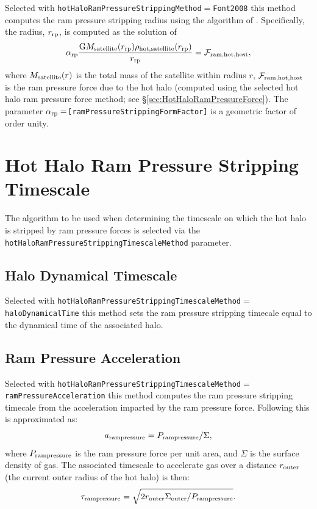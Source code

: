 Selected with {\tt hotHaloRamPressureStrippingMethod}$=${\tt Font2008} this method computes the ram pressure stripping radius using the algorithm of \cite{font_colours_2008}. Specifically, the radius, $r_{\rm rp}$, is computed as the solution of
\begin{equation}
\alpha_{\rm rp} {{\rm G} M_{\rm satellite}(r_{\rm rp}) \rho_{\rm hot, satellite}(r_{\rm rp}) \over r_{\rm rp} } = \mathcal{F}_{\rm ram, hot, host},
\end{equation}
where $M_{\rm satellite}(r)$ is the total mass of the satellite within radius $r$, $\mathcal{F}_{\rm ram, hot, host}$ is the ram pressure force due to the hot halo (computed using the selected hot halo ram pressure force method; see \S\ref{sec:HotHaloRamPressureForce}). The parameter $\alpha_{\rm rp}=${\tt [ramPressureStrippingFormFactor]} is a geometric factor of order unity.


\section{Hot Halo Ram Pressure Stripping Timescale}

The algorithm to be used when determining the timescale on which the hot halo is stripped by ram pressure forces is selected via the {\tt hotHaloRamPressureStrippingTimescaleMethod} parameter.

\subsection{Halo Dynamical Timescale}

Selected with {\tt hotHaloRamPressureStrippingTimescaleMethod}$=${\tt haloDynamicalTime} this method sets the ram pressure stripping timecale equal to the dynamical time of the associated halo.

\subsection{Ram Pressure Acceleration}

Selected with {\tt hotHaloRamPressureStrippingTimescaleMethod}$=${\tt ramPressureAcceleration} this method computes the ram pressure stripping timecale from the acceleration imparted by the ram pressure force. Following \cite{roediger_ram_2007} this is approximated as:
\begin{equation}
 a_{\rm ram pressure} = P_{\rm ram pressure}/\Sigma,
\end{equation}
where $P_{\rm ram pressure}$ is the ram pressure force per unit area, and $\Sigma$ is the surface density of gas. The associated timescale to accelerate gas over a distance $r_{\rm outer}$ (the current outer radius of the hot halo) is then:
\begin{equation}
 \tau_{\rm ram pressure} = \sqrt{2 r_{\rm outer} \Sigma_{\rm outer} / P_{\rm ram pressure}}.
\end{equation}

